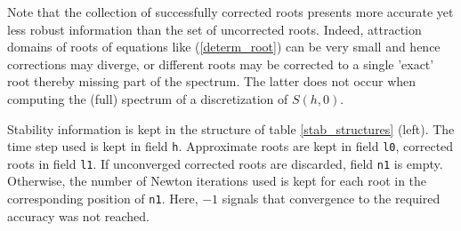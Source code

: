 \documentclass[10pt]{scrartcl}
\newcommand{\blist}[1]{\mbox{\lstinline!#1!}}
\begin{document}
{Note that the collection of successfully corrected roots presents more
accurate yet less robust information than the set of uncorrected
roots. Indeed, attraction domains of roots of equations like
(\ref{determ_root}) can be very small and hence corrections may
diverge, or different roots may be corrected to a single 'exact' root
thereby missing part of the spectrum.  The latter does not occur when
computing the (full) spectrum of a discretization of $S(h,0)$.

Stability information is kept in the structure of table
\ref{stab_structures} (left). The time step used is kept in field
\blist{h}. Approximate roots are kept in field \blist{l0}, corrected
roots in field \blist{l1}.  If unconverged corrected roots are
discarded, field \blist{n1} is empty.  Otherwise, the number of Newton
iterations used is kept for each root in the corresponding position of
\blist{n1}. Here, $-1$ signals that convergence to the required
accuracy was not reached.  

}
\end{document}
